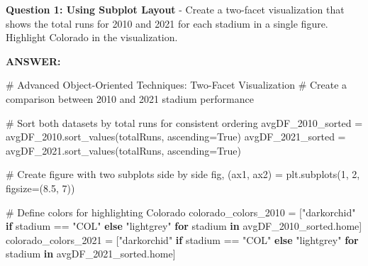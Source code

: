 \documentclass[
  letterpaper,
  DIV=11,
  numbers=noendperiod]{scrartcl}
\newenvironment{Shaded}{\begin{snugshade}}{\end{snugshade}}
\newcommand{\CommentTok}[1]{\textcolor[rgb]{0.37,0.37,0.37}{#1}}
\newcommand{\ControlFlowTok}[1]{\textcolor[rgb]{0.00,0.23,0.31}{\textbf{#1}}}
\newcommand{\DecValTok}[1]{\textcolor[rgb]{0.68,0.00,0.00}{#1}}
\newcommand{\FloatTok}[1]{\textcolor[rgb]{0.68,0.00,0.00}{#1}}
\newcommand{\KeywordTok}[1]{\textcolor[rgb]{0.00,0.23,0.31}{\textbf{#1}}}
\newcommand{\NormalTok}[1]{\textcolor[rgb]{0.00,0.23,0.31}{#1}}
\newcommand{\OperatorTok}[1]{\textcolor[rgb]{0.37,0.37,0.37}{#1}}
\newcommand{\StringTok}[1]{\textcolor[rgb]{0.13,0.47,0.30}{#1}}
\newcommand{\VariableTok}[1]{\textcolor[rgb]{0.07,0.07,0.07}{#1}}
\begin{document}
\begin{tcolorbox}[enhanced jigsaw, rightrule=.15mm, coltitle=black, colbacktitle=quarto-callout-important-color!10!white, opacitybacktitle=0.6, arc=.35mm, leftrule=.75mm, colback=white, title=\textcolor{quarto-callout-important-color}{\faExclamation}\hspace{0.5em}{🤔 Discussion Questions: Advanced Object-Oriented Techniques}, colframe=quarto-callout-important-color-frame, bottomrule=.15mm, left=2mm, opacityback=0, toptitle=1mm, titlerule=0mm, toprule=.15mm, bottomtitle=1mm, breakable]

\textbf{Question 1: Using Subplot Layout} - Create a two-facet
visualization that shows the total runs for 2010 and 2021 for each
stadium in a single figure. Highlight Colorado in the visualization.

\textbf{ANSWER:}

\begin{Shaded}
\begin{Highlighting}[]
\CommentTok{\# Advanced Object{-}Oriented Techniques: Two{-}Facet Visualization}
\CommentTok{\# Create a comparison between 2010 and 2021 stadium performance}

\CommentTok{\# Sort both datasets by total runs for consistent ordering}
\NormalTok{avgDF\_2010\_sorted }\OperatorTok{=}\NormalTok{ avgDF\_2010.sort\_values(}\StringTok{\textquotesingle{}totalRuns\textquotesingle{}}\NormalTok{, ascending}\OperatorTok{=}\VariableTok{True}\NormalTok{)}
\NormalTok{avgDF\_2021\_sorted }\OperatorTok{=}\NormalTok{ avgDF\_2021.sort\_values(}\StringTok{\textquotesingle{}totalRuns\textquotesingle{}}\NormalTok{, ascending}\OperatorTok{=}\VariableTok{True}\NormalTok{)}

\CommentTok{\# Create figure with two subplots side by side}
\NormalTok{fig, (ax1, ax2) }\OperatorTok{=}\NormalTok{ plt.subplots(}\DecValTok{1}\NormalTok{, }\DecValTok{2}\NormalTok{, figsize}\OperatorTok{=}\NormalTok{(}\FloatTok{8.5}\NormalTok{, }\DecValTok{7}\NormalTok{))}

\CommentTok{\# Define colors for highlighting Colorado}
\NormalTok{colorado\_colors\_2010 }\OperatorTok{=}\NormalTok{ [}\StringTok{"darkorchid"} \ControlFlowTok{if}\NormalTok{ stadium }\OperatorTok{==} \StringTok{"COL"} \ControlFlowTok{else} \StringTok{"lightgrey"} 
                       \ControlFlowTok{for}\NormalTok{ stadium }\KeywordTok{in}\NormalTok{ avgDF\_2010\_sorted.home]}
\NormalTok{colorado\_colors\_2021 }\OperatorTok{=}\NormalTok{ [}\StringTok{"darkorchid"} \ControlFlowTok{if}\NormalTok{ stadium }\OperatorTok{==} \StringTok{"COL"} \ControlFlowTok{else} \StringTok{"lightgrey"} 
                       \ControlFlowTok{for}\NormalTok{ stadium }\KeywordTok{in}\NormalTok{ avgDF\_2021\_sorted.home]}


\end{Highlighting}
\end{Shaded}
\end{tcolorbox}
\end{document}
